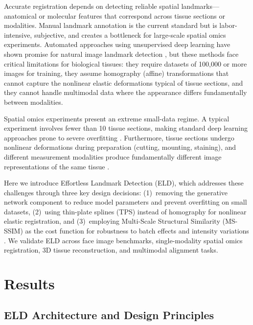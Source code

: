 \documentclass[11pt]{article}
\begin{document}
Accurate registration depends on detecting reliable spatial landmarks---anatomical or molecular features that correspond across tissue sections or modalities. Manual landmark annotation is the current standard but is labor-intensive, subjective, and creates a bottleneck for large-scale spatial omics experiments. Automated approaches using unsupervised deep learning have shown promise for natural image landmark detection \citep{theis2016unsupervised, jakab2021unsupervised}, but these methods face critical limitations for biological tissues: they require datasets of 100,000 or more images for training, they assume homography (affine) transformations that cannot capture the nonlinear elastic deformations typical of tissue sections, and they cannot handle multimodal data where the appearance differs fundamentally between modalities.

Spatial omics experiments present an extreme small-data regime. A typical experiment involves fewer than 10 tissue sections, making standard deep learning approaches prone to severe overfitting \citep{deep_learning_review2015}. Furthermore, tissue sections undergo nonlinear deformations during preparation (cutting, mounting, staining), and different measurement modalities produce fundamentally different image representations of the same tissue \citep{image_registration_review2013}.

Here we introduce Effortless Landmark Detection (ELD), which addresses these challenges through three key design decisions: (1)~removing the generative network component to reduce model parameters and prevent overfitting on small datasets, (2)~using thin-plate splines (TPS) \citep{tps_bookstein1989} instead of homography for nonlinear elastic registration, and (3)~employing Multi-Scale Structural Similarity (MS-SSIM) \citep{wang2019ms_ssim} as the cost function for robustness to batch effects and intensity variations \citep{batch_effects2018}. We validate ELD across face image benchmarks, single-modality spatial omics registration, 3D tissue reconstruction, and multimodal alignment tasks.

\section{Results}

\subsection{ELD Architecture and Design Principles}
\end{document}
